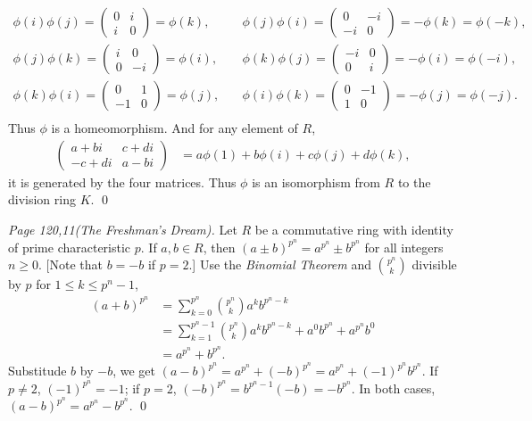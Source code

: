 \begin{enumerate}
\begin{align*}
	\phi(i)\phi(j)=\begin{pmatrix}
	0 & i \\
	i & 0
	\end{pmatrix}=\phi(k),&\quad \phi(j)\phi(i)=\begin{pmatrix}
	0 & -i \\
	-i & 0
	\end{pmatrix}=-\phi(k)=\phi(-k), \\
	\phi(j)\phi(k)=\begin{pmatrix}
	i & 0 \\
	0 & -i
	\end{pmatrix}=\phi(i),&\quad \phi(k)\phi(j)=\begin{pmatrix}
	-i & 0 \\
	0 & i
	\end{pmatrix}=-\phi(i)=\phi(-i), \\
	\phi(k)\phi(i)=\begin{pmatrix}
	0 & 1 \\
	-1 & 0
	\end{pmatrix}=\phi(j),&\quad \phi(i)\phi(k)=\begin{pmatrix}
	0 & -1 \\
	1 & 0
	\end{pmatrix}=-\phi(j)=\phi(-j). \\
\end{align*}
Thus $\phi$ is a homeomorphism. And for any element of $R$, 
\begin{align*}
	\begin{pmatrix}
		a+bi & c+di \\
		-c+di & a-bi
	\end{pmatrix}&= 
	a\phi(1)+b\phi(i)+c\phi(j)+d\phi(k), 
\end{align*}
it is generated by the four matrices. Thus $\phi$ is an isomorphism from $R$ to the division ring $K$.
\qed

\prob
\textit{Page 120,11(The Freshman's Dream). }%
Let $R$ be a commutative ring with identity of prime characteristic $p$. If $a,b\in R$, then $(a\pm b)^{p^n}=a^{p^n}\pm b^{p^n}$ for all integers $n\geq 0$. [Note that $b=-b$ if $p=2$.]
\soln
Use the \textit{Binomial Theorem} and $\binom{p^n}{k}$ divisible by $p$ for $1\leq k\leq p^n-1$,  
\begin{align*}
	(a+ b)^{p^n} &= \sum_{k=0}^{p^n} \binom{p^n}{k} a^k b^{p^n-k} \\
	&= \sum_{k=1}^{p^n-1} \binom{p^n}{k} a^k b^{p^n-k} + a^0  b^{p^n}+a^{p^n} b^0 \\
	&= a^{p^n}+ b^{p^n}.
\end{align*}
Substitude $b$ by $-b$, we get $(a- b)^{p^n}=a^{p^n}+ (-b)^{p^n}=a^{p^n}+ (-1)^{p^n}b^{p^n}$. If $p\neq 2$, $(-1)^{p^n}=-1$; if $p=2$, $(-b)^{p^n}=b^{p^n-1}(-b)=-b^{p^n}$. In both cases, $(a- b)^{p^n}=a^{p^n}- b^{p^n}$.
\qed


\end{enumerate}
